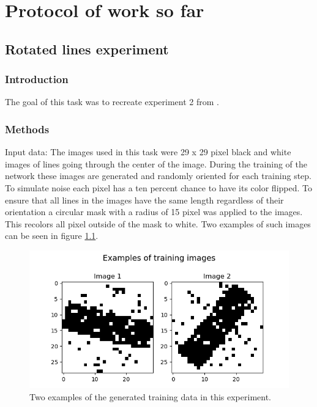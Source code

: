 \chapter{Protocol of work so far}

\section{Rotated lines experiment}

\subsection{Introduction}

The goal of this task was to recreate experiment 2 from \citet{nessler}.


\subsection{Methods}
Input data:
The images used in this task were 29 x 29 pixel black and white images of lines going through the center of the image. During the training of the network these images are generated and randomly oriented for each training step. To simulate noise each pixel has a ten percent chance to have its color flipped. To ensure that all lines in the images have the same length regardless of their orientation a circular mask with a radius of 15 pixel was applied to the images. This recolors all pixel outside of the mask to white. Two examples of such images can be seen in figure \ref{fig:angleImages}.

\begin{figure}
  \includegraphics[width=\linewidth]{figures/angleNetwork/trainingImages.png}
  \caption{Two examples of the generated training data in this experiment.}
  \label{fig:angleImages}
\end{figure}

